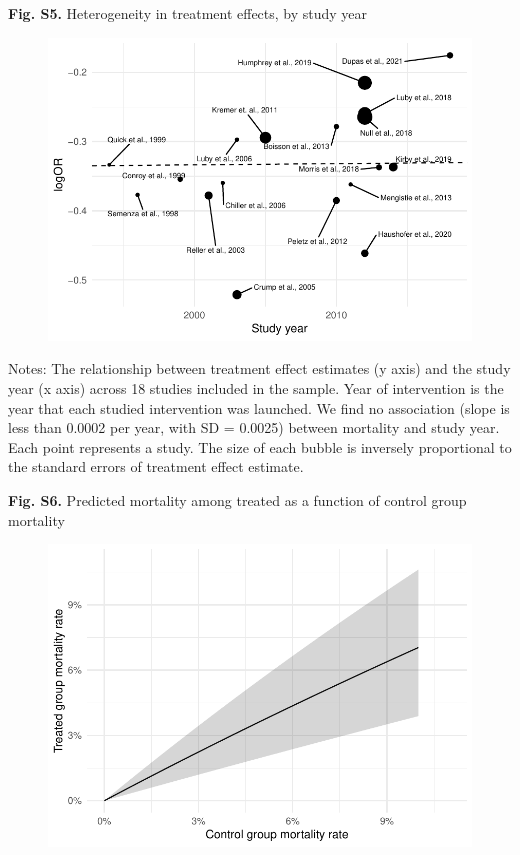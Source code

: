 \documentclass[12pt]{article}
\begin{document}
\newpage
\noindent\textbf{Fig. S5.}  Heterogeneity in treatment effects, by study year
\begin{figure}[H]
    \centering
    \includegraphics{figures/bubble-plot-year.pdf}
\end{figure}
{\noindent\fontsize{10}{10}\selectfont Notes: The relationship between treatment effect estimates (y axis) and the study year (x axis) across 18 studies included in the sample. Year of intervention is the year that each studied intervention was launched. We find no association (slope is less than 0.0002 per year, with SD = 0.0025) between mortality and study year. Each point represents a study. The size of each bubble is inversely proportional to the standard errors of treatment effect estimate.}

\newpage
\noindent\textbf{Fig. S6.}  Predicted mortality among treated as a function of control group mortality 

\begin{figure}[H]
    \centering
    \includegraphics{figures/mortality-vs-baseline.pdf}
\end{figure}
\end{document}

